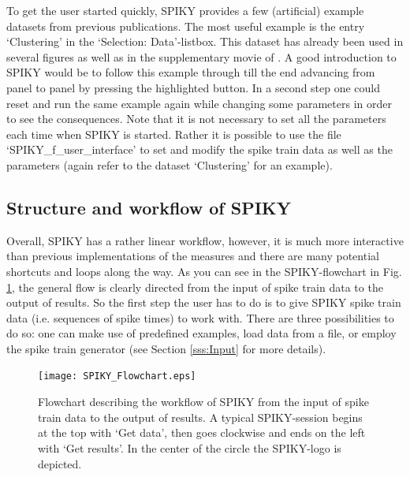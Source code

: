 \documentclass[10pt,twocolumn]{elsart5p}
\begin{document}
To get the user started quickly, SPIKY provides a few (artificial) example datasets from previous publications. The most useful example is the entry `Clustering' in the `Selection: Data'-listbox. This dataset has already been used in several figures as well as in the supplementary movie of \cite{Kreuz13}. A good introduction to SPIKY would be to follow this example through till the end advancing from panel to panel by pressing the highlighted button. In a second step one could reset and run the same example again while changing some parameters in order to see the consequences. Note that it is not necessary to set all the parameters each time when SPIKY is started. Rather it is possible to use the file `SPIKY\_f\_user\_interface' to set and modify the spike train data as well as the parameters (again refer to the dataset `Clustering' for an example).


\subsection{\label{ss:Structure} Structure and workflow of SPIKY}

Overall, SPIKY has a rather linear workflow, however, it is much more interactive than previous implementations of the measures and there are many potential shortcuts and loops along the way. As you can see in the SPIKY-flowchart in Fig. \ref{fig:SPIKY-Flowchart}, the general flow is clearly directed from the input of spike train data to the output of results. So the first step the user has to do is to give SPIKY spike train data (i.e. sequences of spike times) to work with. There are three possibilities to do so: one can make use of predefined examples, load data from a file, or employ the spike train generator (see Section \ref{sss:Input} for more details).
%
%
\begin{figure}
    \texttt{[image: SPIKY\_Flowchart.eps]}
    \caption{\abb\label{fig:SPIKY-Flowchart} Flowchart describing the workflow of SPIKY from 	the input of spike train data to the output of results. A typical SPIKY-session begins at the top with `Get data', then goes clockwise and ends on the left with `Get results'. In the center of the circle the SPIKY-logo is depicted.}
\end{figure}
%
\end{document}
